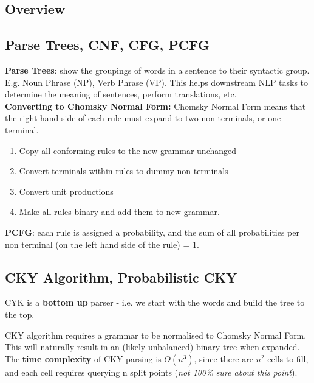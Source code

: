 \documentclass[]{article}
\begin{document}
	\subsection{Overview}
	
	\subsection{Parse Trees, CNF, CFG, PCFG}
	
	\textbf{Parse Trees}: show the groupings of words in a sentence to their syntactic group. E.g. Noun Phrase (NP), Verb Phrase (VP). This helps downstream NLP tasks to determine the meaning of sentences, perform translations, etc. \\
	
	\textbf{Converting to Chomsky Normal Form:}
	Chomsky Normal Form means that the right hand side of each rule must expand to two non terminals, or one terminal. \cite{jurafsky2018speech}
	
	\begin{enumerate}
		\item Copy all conforming rules to the new grammar unchanged
		\item Convert terminals within rules to dummy non-terminals
		\item Convert unit productions
		\item Make all rules binary and add them to new grammar.
	\end{enumerate}
	

	\textbf{PCFG}: each rule is assigned a probability, and the sum of all probabilities per non terminal (on the left hand side of the rule) = 1.

	
	\subsection{CKY Algorithm, Probabilistic CKY}
	
	CYK is a \textbf{bottom up} parser - i.e. we start with the words and build the tree to the top. 
	
	CKY algorithm requires a grammar to be normalised to Chomsky Normal Form. This will naturally result in an (likely unbalanced) binary tree when expanded. \\
	
	The \textbf{time complexity} of CKY parsing is $O(n^3)$, since there are $n^2$ cells to fill, and each cell requires querying n split points (\textit{not 100\% sure about this point}). 
	
	
	
	
\end{document}
